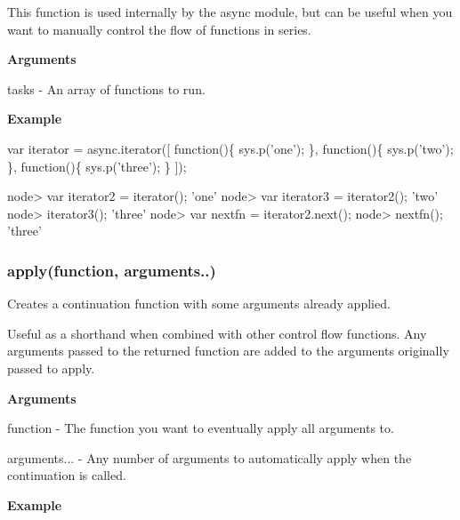 This function is used internally by the {\ttfamily async} module, but can be useful when you want to manually control the flow of functions in series.

{\bfseries Arguments}


\begin{DoxyItemize}
\item {\ttfamily tasks} -\/ An array of functions to run.
\end{DoxyItemize}

{\bfseries Example}


\begin{DoxyCode}
var iterator = async.iterator([
    \textcolor{keyword}{function}()\{ sys.p(\textcolor{stringliteral}{'one'}); \},
    \textcolor{keyword}{function}()\{ sys.p(\textcolor{stringliteral}{'two'}); \},
    \textcolor{keyword}{function}()\{ sys.p(\textcolor{stringliteral}{'three'}); \}
]);

node> var iterator2 = iterator();
\textcolor{stringliteral}{'one'}
node> var iterator3 = iterator2();
\textcolor{stringliteral}{'two'}
node> iterator3();
\textcolor{stringliteral}{'three'}
node> var nextfn = iterator2.next();
node> nextfn();
\textcolor{stringliteral}{'three'}
\end{DoxyCode}
 



\label{_apply}%
 \subsubsection*{apply(function, arguments..)}

Creates a continuation function with some arguments already applied.

Useful as a shorthand when combined with other control flow functions. Any arguments passed to the returned function are added to the arguments originally passed to apply.

{\bfseries Arguments}


\begin{DoxyItemize}
\item {\ttfamily function} -\/ The function you want to eventually apply all arguments to.
\item {\ttfamily arguments...} -\/ Any number of arguments to automatically apply when the continuation is called.
\end{DoxyItemize}

{\bfseries Example}


